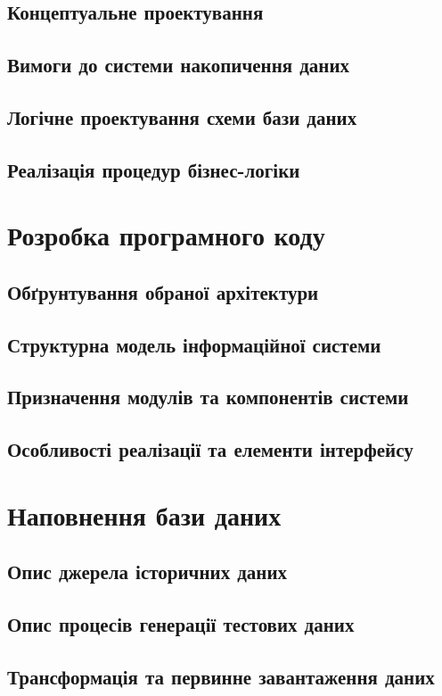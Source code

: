 \documentclass[oneside,14pt]{extarticle}
\begin{document}
\subsection{Концептуальне проектування}
\subsection{Вимоги до системи накопичення даних}
\subsection{Логічне проектування схеми бази даних}
\subsection{Реалізація процедур бізнес-логіки}
\newpage

\section{Розробка програмного коду}
\subsection{Обґрунтування обраної архітектури}
\subsection{Структурна модель інформаційної системи}
\subsection{Призначення модулів та компонентів системи}
\subsection{Особливості реалізації та елементи інтерфейсу}
\newpage

\section{Наповнення бази даних}
\subsection{Опис джерела історичних даних}
\subsection{Опис процесів генерації тестових даних}
\subsection{Трансформація та первинне завантаження даних}
\newpage
\end{document}
